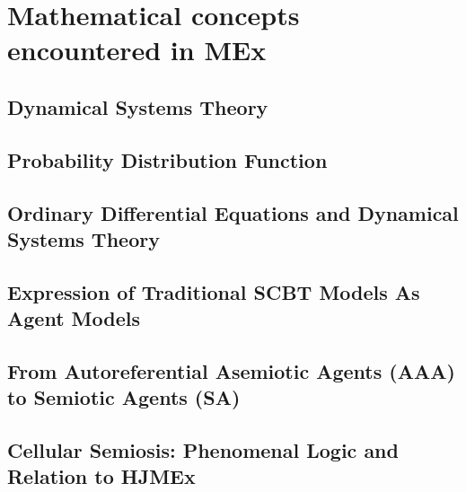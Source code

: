 \section{Mathematical concepts encountered in MEx}
\subsection{Dynamical Systems Theory}
\subsection{Probability Distribution Function}
\label{PDF}
\subsection{Ordinary Differential Equations and Dynamical Systems Theory}
\label{SODEs}

\subsection{Expression of Traditional SCBT Models As Agent Models}
\subsection{From Autoreferential Asemiotic Agents (AAA) to Semiotic Agents (SA)}
\subsection{Cellular Semiosis: Phenomenal Logic and Relation to HJMEx}